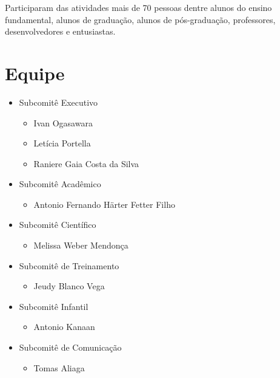 \documentclass[12pt]{article}
\begin{document}
Participaram das atividades mais de 70 pessoas dentre
alunos do ensino fundamental,
alunos de graduação,
alunos de pós-graduação,
professores,
desenvolvedores
e entusiastas.

\newpage

\section*{Equipe}

\begin{itemize}
  \item Subcomitê Executivo

    \begin{itemize}
      \item Ivan Ogasawara
      \item Letícia Portella
      \item Raniere Gaia Costa da Silva
    \end{itemize}

  \item Subcomitê Acadêmico

    \begin{itemize}
      \item Antonio Fernando Härter Fetter Filho
    \end{itemize}

  \item Subcomitê Científico

    \begin{itemize}
      \item Melissa Weber Mendonça
    \end{itemize}

  \item Subcomitê de Treinamento

    \begin{itemize}
      \item Jeudy Blanco Vega
    \end{itemize}

  \item Subcomitê Infantil

    \begin{itemize}
      \item Antonio Kanaan
    \end{itemize}

  \item Subcomitê de Comunicação

    \begin{itemize}
      \item Tomas Aliaga
    \end{itemize}


\end{itemize}
\end{document}
